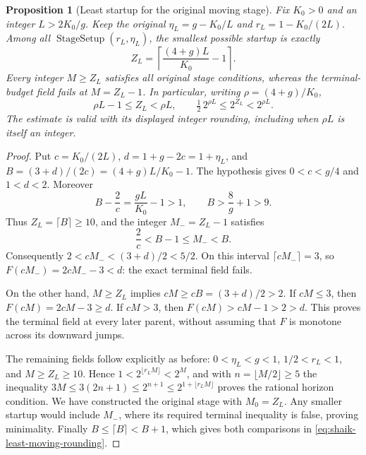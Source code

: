 \documentclass[11pt]{article}
\newtheorem{proposition}{Proposition}
\theoremstyle{remark}\newtheorem{remark}[proposition]{Remark}
\begin{document}
\begin{proposition}[Least startup for the original moving stage]
\label{prop:shaik-least-moving-startup}
Fix \(K_0>0\) and an integer \(L>2K_0/g\). Keep the original
\(\eta_L=g-K_0/L\) and \(r_L=1-K_0/(2L)\). Among all
\(\operatorname{StageSetup}(r_L,\eta_L)\), the smallest possible
startup is exactly
\begin{equation}\label{eq:shaik-least-moving-startup}
 Z_L=\left\lceil\frac{(4+g)L}{K_0}-1\right\rceil .
\end{equation}
Every integer \(M\ge Z_L\) satisfies all original stage conditions,
whereas the terminal-budget field fails at \(M=Z_L-1\).
In particular, writing \(\rho=(4+g)/K_0\),
\begin{equation}\label{eq:shaik-least-moving-rounding}
 \rho L-1\le Z_L<\rho L,\qquad
 \tfrac12\,2^{\rho L}\le2^{Z_L}<2^{\rho L}.
\end{equation}
The estimate is valid with its displayed integer rounding, including
when \(\rho L\) is itself an integer.
\end{proposition}
\begin{proof}
Put \(c=K_0/(2L)\), \(d=1+g-2c=1+\eta_L\), and
\(B=(3+d)/(2c)= (4+g)L/K_0-1\).
The hypothesis gives \(0<c<g/4\) and \(1<d<2\).
Moreover
\[
 B-\frac2c=\frac{gL}{K_0}-1>1,\qquad
 B>\frac{8}{g}+1>9.
\]
Thus \(Z_L=\lceil B\rceil\ge10\), and the integer
\(M_-=Z_L-1\) satisfies
\[
 \frac2c < B-1\le M_-<B.
\]
Consequently \(2<cM_-<(3+d)/2<5/2\).
On this interval \(\lceil cM_-\rceil=3\), so
\(F(cM_-)=2cM_--3<d\): the exact terminal field fails.

On the other hand, \(M\ge Z_L\) implies
\(cM\ge cB=(3+d)/2>2\). If \(cM\le3\), then
\(F(cM)=2cM-3\ge d\). If \(cM>3\), then
\(F(cM)>cM-1>2>d\). This proves the terminal field at
every later parent, without assuming that \(F\) is monotone
across its downward jumps.

The remaining fields follow explicitly as before:
\(0<\eta_L<g<1\), \(1/2<r_L<1\), and \(M\ge Z_L\ge10\).
Hence \(1<2^{\lfloor r_LM\rfloor}<2^M\), and with
\(n=\lfloor M/2\rfloor\ge5\) the inequality
\(3M\le3(2n+1)\le2^{n+1}\le2^{1+\lfloor r_LM\rfloor}\)
proves the rational horizon condition. We have constructed
the original stage with \(M_0=Z_L\).
Any smaller startup would include \(M_-\), where its required
terminal inequality is false, proving minimality.
Finally \(B\le\lceil B\rceil<B+1\), which gives both
comparisons in \eqref{eq:shaik-least-moving-rounding}.
\end{proof}
\end{document}
